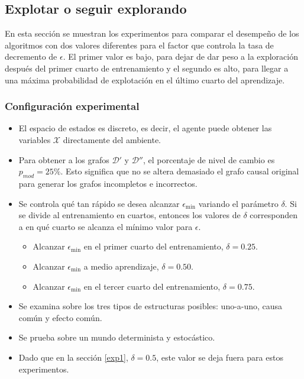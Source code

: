 
\subsection{Explotar o seguir explorando}\label{subsection:exp-epsilon}

En esta sección se muestran los experimentos para comparar
el desempeño de los algoritmos con dos valores diferentes para
el factor que controla la tasa de decremento de $\epsilon$. El primer valor 
es bajo, para dejar de dar peso a la exploración después del primer
cuarto de entrenamiento y el segundo es alto, para llegar a una máxima probabilidad
de explotación en el último cuarto del aprendizaje.

\subsubsection{Configuración experimental}

\begin{itemize}
    \item El espacio de estados es discreto, es decir, el agente puede
    obtener las variables $\mathcal{X}$ directamente del ambiente.
    \item Para obtener a los
    grafos $\mathcal{D'}$ y $\mathcal{D''}$,
    el porcentaje de nivel de cambio  es $p_{mod} = 25 \%$. Esto significa que no se altera demasiado el grafo causal original para
    generar los grafos incompletos e incorrectos.
    \item Se controla qué tan rápido se desea alcanzar $\epsilon_{\min}$ variando el parámetro $\delta$. Si se divide al entrenamiento en cuartos,  entonces los valores de $\delta$ corresponden a en qué cuarto se alcanza el mínimo valor para $\epsilon$.
    \begin{itemize}
        \item Alcanzar $\epsilon_{\min}$ en el primer cuarto del entrenamiento, $\delta = 0.25$.
        \item Alcanzar $\epsilon_{\min}$ a medio aprendizaje, $\delta = 0.50$.
        \item Alcanzar $\epsilon_{\min}$ en el tercer cuarto del entrenamiento, $\delta = 0.75$.
    \end{itemize}
    \item Se examina sobre los tres tipos de estructuras posibles: uno-a-uno, 
    causa común y efecto común. 
    \item Se prueba sobre un mundo determinista y estocástico.
    \item Dado que en la sección \ref{exp1}, $\delta=0.5$, este valor se deja fuera para estos experimentos.
\end{itemize}

